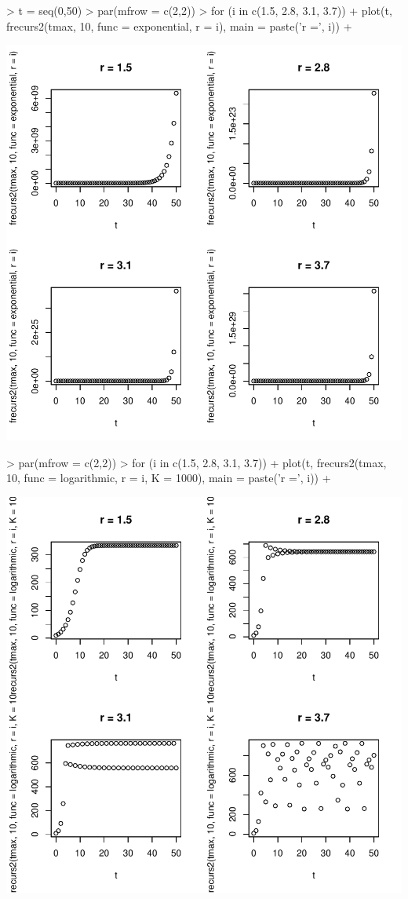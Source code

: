 \documentclass{article}
\begin{document}
\begin{Schunk}
\begin{Sinput}
> t = seq(0,50)
> par(mfrow = c(2,2))
> for (i in c(1.5, 2.8, 3.1, 3.7)) {
+   plot(t, frecurs2(tmax, 10, func = exponential, r = i), main = paste('r =', i))
+ }
\end{Sinput}
\end{Schunk}
\includegraphics{TP1-008}

\begin{Schunk}
\begin{Sinput}
> par(mfrow = c(2,2))
> for (i in c(1.5, 2.8, 3.1, 3.7)) {
+   plot(t, frecurs2(tmax, 10, func = logarithmic, r = i, K = 1000), main = paste('r =', i))
+ }
\end{Sinput}
\end{Schunk}
\includegraphics{TP1-009}
\end{document}
